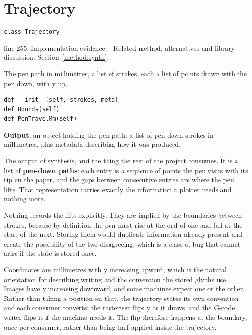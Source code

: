 \section{Trajectory}\label{fn:synthesise:Trajectory}
\begin{lstlisting}[style=sig]
class Trajectory
\end{lstlisting}
 line 255. Implementation evidence: \cite{code2026}. Related method, alternatives and library discussion: Section~\ref{method:synth}.


The pen path in millimetres, a list of strokes, each a list of points drawn with the pen down, with y up.


\begin{lstlisting}[style=plain]
def __init__(self, strokes, meta)
def Bounds(self)
def PenTravelMm(self)
\end{lstlisting}


\noindent\textbf{Output.} an object holding the pen path: a list of pen-down strokes in millimetres, plus metadata describing how it was produced.


The output of synthesis, and the thing the rest of the project consumes. It is a list of \textbf{pen-down paths}: each entry is a sequence of points the pen visits with its tip on the paper, and the gaps between consecutive entries are where the pen lifts. That representation carries exactly the information a plotter needs and nothing more.


Nothing records the lifts explicitly. They are implied by the boundaries between strokes, because by definition the pen must rise at the end of one and fall at the start of the next. Storing them would duplicate information already present and create the possibility of the two disagreeing, which is a class of bug that cannot arise if the state is stored once.


Coordinates are millimetres with y increasing upward, which is the natural orientation for describing writing and the convention the stored glyphs use. Images have y increasing downward, and some machines expect one or the other. Rather than taking a position on that, the trajectory states its own convention and each consumer converts: the rasteriser flips y as it draws, and the G-code writer flips it if the machine needs it. The flip therefore happens at the boundary, once per consumer, rather than being half-applied inside the trajectory.


